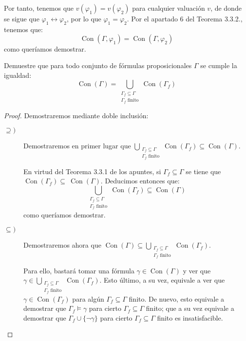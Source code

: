 \documentclass[12pt]{article}
\DeclareMathOperator{\Con}{Con}
\begin{document}
\begin{ejercicio}
        Por tanto, tenemos que $v(\varphi_1)=v(\varphi_2)$ para cualquier valuación $v$, de donde se sigue que $\varphi_1\leftrightarrow\varphi_2$, por lo que $\varphi_1=\varphi_2$. Por el 
        apartado 6 del Teorema 3.3.2., tenemos que:
        \begin{equation*}
            \Con(\Gamma, \varphi_1) = \Con(\Gamma, \varphi_2)
        \end{equation*}
        como queríamos demostrar.
    \end{ejercicio}

    \begin{ejercicio}
        Demuestre que para todo conjunto de fórmulas proposicionales $\Gamma$ se cumple la igualdad:
        \begin{equation*}
            \Con(\Gamma) = \bigcup_{\substack{\Gamma_f\subseteq \Gamma\\\Gamma_f \text{ finito}}} \Con\left(\Gamma_f\right)
        \end{equation*}

        \begin{proof}
            Demostraremos mediante doble inclusión:
            \begin{description}
                \item[$\supseteq)$] Demostraremos en primer lugar que $\displaystyle\bigcup\limits_{\substack{\Gamma_f\subseteq \Gamma\\\Gamma_f \text{ finito}}} \Con\left(\Gamma_f\right)\subseteq \Con(\Gamma)$.
                
                En virtud del Teorema 3.3.1 de los apuntes, si $\Gamma_f\subseteq \Gamma$ se tiene que
                $\Con(\Gamma_f)\subseteq~\Con(\Gamma)$. Deducimos entonces que:
                \begin{equation*}
                    \bigcup_{\substack{\Gamma_f\subseteq \Gamma\\\Gamma_f \text{ finito}}} \Con\left(\Gamma_f\right)\subseteq \Con(\Gamma)
                \end{equation*}
                como queríamos demostrar.


                \item[$\subseteq)$] Demostraremos ahora que $\Con(\Gamma)\subseteq \displaystyle\bigcup\limits_{\substack{\Gamma_f\subseteq \Gamma\\\Gamma_f \text{ finito}}} \Con\left(\Gamma_f\right)$.
                
                Para ello, bastará tomar una fórmula $\gamma\in \Con(\Gamma)$ y ver que $\displaystyle \gamma\in\bigcup_{\substack{\Gamma_f\subseteq \Gamma\\\Gamma_f \text{ finito}}} \Con\left(\Gamma_f\right)$.
                Esto último, a su vez, equivale a ver que $\gamma\in \Con(\Gamma_f)$ para algún $\Gamma_f\subseteq \Gamma$ finito.
                De nuevo, esto equivale a demostrar que $\Gamma_f\models \gamma$ para cierto $\Gamma_f\subseteq \Gamma$ finito;
                que a su vez equivale a demostrar que $\Gamma_f\cup\{\lnot \gamma\}$ para cierto $\Gamma_f\subseteq \Gamma$ finito es insatisfacible.


\end{description}
\end{proof}
\end{ejercicio}
\end{document}

